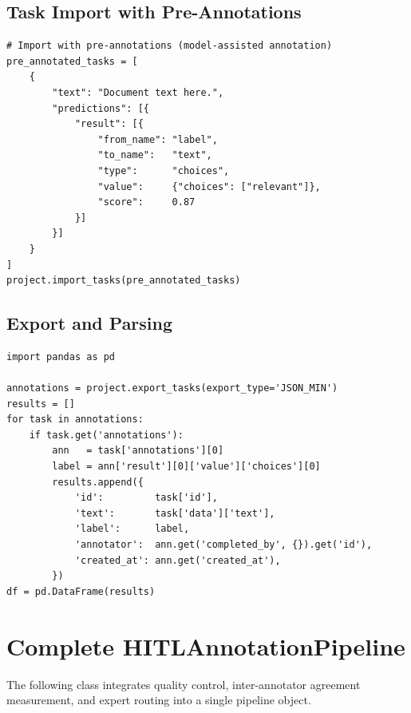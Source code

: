 \subsection{Task Import with Pre-Annotations}

\begin{lstlisting}[style=python, caption={Importing tasks with model pre-annotations}]
# Import with pre-annotations (model-assisted annotation)
pre_annotated_tasks = [
    {
        "text": "Document text here.",
        "predictions": [{
            "result": [{
                "from_name": "label",
                "to_name":   "text",
                "type":      "choices",
                "value":     {"choices": ["relevant"]},
                "score":     0.87
            }]
        }]
    }
]
project.import_tasks(pre_annotated_tasks)
\end{lstlisting}

\subsection{Export and Parsing}

\begin{lstlisting}[style=python, caption={Annotation export and label parsing}]
import pandas as pd

annotations = project.export_tasks(export_type='JSON_MIN')
results = []
for task in annotations:
    if task.get('annotations'):
        ann   = task['annotations'][0]
        label = ann['result'][0]['value']['choices'][0]
        results.append({
            'id':         task['id'],
            'text':       task['data']['text'],
            'label':      label,
            'annotator':  ann.get('completed_by', {}).get('id'),
            'created_at': ann.get('created_at'),
        })
df = pd.DataFrame(results)
\end{lstlisting}

\section{Complete HITLAnnotationPipeline}

The following class integrates quality control, inter-annotator agreement measurement, and expert routing into a single pipeline object.

